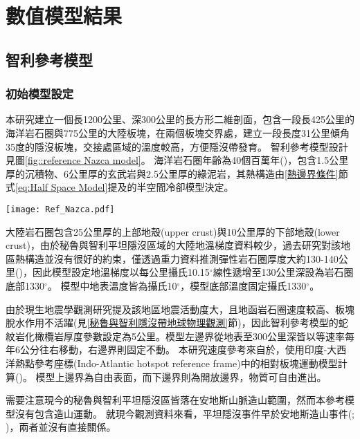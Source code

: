 
\chapter{數值模型結果}

\section{智利參考模型}
\subsection{初始模型設定}\label{智利參考模型初始模型設定}
本研究建立一個長1200公里、深300公里的長方形二維剖面，包含一段長425公里的海洋岩石圈與775公里的大陸板塊，在兩個板塊交界處，建立一段長度31公里傾角35度的隱沒板塊，交接處區域的溫度較高，方便隱沒帶發育。
智利參考模型設計見圖\ref{fig::reference Nazca model}。
海洋岩石圈年齡為40個百萬年(\citealp{muller2019})，包含1.5公里厚的沉積物、6公里厚的玄武岩與2.5公里厚的綠泥岩，其熱構造由\ref{熱邊界條件}節式\ref{eq:Half Space Model}提及的半空間冷卻模型決定。

\begin{figure*}[hb]
    \centering
    \texttt{[image: Ref\_Nazca.pdf]}
    \caption[智利參考模型設計與邊界條件示意圖]{智利參考模型設計與邊界條件示意圖}
    \label{fig::reference Nazca model}
\end{figure*}

大陸岩石圈包含25公里厚的上部地殼(upper crust)與10公里厚的下部地殼(lower crust)，由於秘魯與智利平坦隱沒區域的大陸地溫梯度資料較少，過去研究對該地區熱構造並沒有很好的約束，僅透過重力資料推測彈性岩石圈厚度大約130-140公里(\citealp{perez2008})，因此模型設定地溫梯度以每公里攝氏10.15$^{\circ}$線性遞增至130公里深設為岩石圈底部1330$^{\circ}$。
模型中地表溫度皆為攝氏10$^{\circ}$，模型底部溫度固定攝氏1330$^{\circ}$。

由於現生地震學觀測研究提及該地區地震活動度大，且地函岩石圈速度較高、板塊脫水作用不活躍(見\ref{秘魯與智利隱沒帶地球物理觀測}節)，因此智利參考模型的蛇紋岩化橄欖岩厚度參數設定為5公里。模型左邊界從地表至300公里深皆以等速率每年6公分往右移動，右邊界則固定不動。
本研究速度參考來自於\citealp{o2005uncertainties}，使用印度-大西洋熱點參考座標(Indo-Atlantic hotspot reference frame)中的相對板塊運動模型計算(\citealp{schellart2008global})。
模型上邊界為自由表面，而下邊界則為開放邊界，物質可自由進出。

需要注意現今的秘魯與智利平坦隱沒區皆落在安地斯山脈造山範圍，然而本參考模型沒有包含造山運動。
就現今觀測資料來看，平坦隱沒事件早於安地斯造山事件(\citealp{chen2019southward}; \citealp{hu2021southward})，兩者並沒有直接關係。


